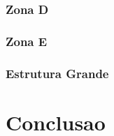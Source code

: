 \documentclass[12pt, a4paper]{article}
\begin{document}
\subsubsection{Zona D}\label{ssub:Zona D}



\subsubsection{Zona E}\label{ssub:Zona E}



\subsubsection{Estrutura Grande}\label{ssub:Estrutura Grande}








\section{Conclusao}\label{sec:Conclusao}


\printbibliography{}
\end{document}
